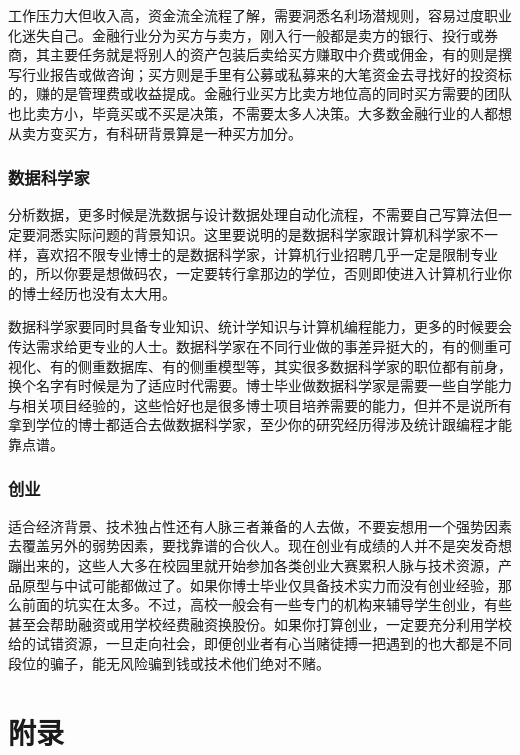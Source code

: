 \documentclass[]{tufte-book}
\begin{document}
工作压力大但收入高，资金流全流程了解，需要洞悉名利场潜规则，容易过度职业化迷失自己。金融行业分为买方与卖方，刚入行一般都是卖方的银行、投行或券商，其主要任务就是将别人的资产包装后卖给买方赚取中介费或佣金，有的则是撰写行业报告或做咨询；买方则是手里有公募或私募来的大笔资金去寻找好的投资标的，赚的是管理费或收益提成。金融行业买方比卖方地位高的同时买方需要的团队也比卖方小，毕竟买或不买是决策，不需要太多人决策。大多数金融行业的人都想从卖方变买方，有科研背景算是一种买方加分。

\hypertarget{ux6570ux636eux79d1ux5b66ux5bb6}{%
\subsection{数据科学家}\label{ux6570ux636eux79d1ux5b66ux5bb6}}

分析数据，更多时候是洗数据与设计数据处理自动化流程，不需要自己写算法但一定要洞悉实际问题的背景知识。这里要说明的是数据科学家跟计算机科学家不一样，喜欢招不限专业博士的是数据科学家，计算机行业招聘几乎一定是限制专业的，所以你要是想做码农，一定要转行拿那边的学位，否则即使进入计算机行业你的博士经历也没有太大用。

数据科学家要同时具备专业知识、统计学知识与计算机编程能力，更多的时候要会传达需求给更专业的人士。数据科学家在不同行业做的事差异挺大的，有的侧重可视化、有的侧重数据库、有的侧重模型等，其实很多数据科学家的职位都有前身，换个名字有时候是为了适应时代需要。博士毕业做数据科学家是需要一些自学能力与相关项目经验的，这些恰好也是很多博士项目培养需要的能力，但并不是说所有拿到学位的博士都适合去做数据科学家，至少你的研究经历得涉及统计跟编程才能靠点谱。

\hypertarget{ux521bux4e1a}{%
\subsection{创业}\label{ux521bux4e1a}}

适合经济背景、技术独占性还有人脉三者兼备的人去做，不要妄想用一个强势因素去覆盖另外的弱势因素，要找靠谱的合伙人。现在创业有成绩的人并不是突发奇想蹦出来的，这些人大多在校园里就开始参加各类创业大赛累积人脉与技术资源，产品原型与中试可能都做过了。如果你博士毕业仅具备技术实力而没有创业经验，那么前面的坑实在太多。不过，高校一般会有一些专门的机构来辅导学生创业，有些甚至会帮助融资或用学校经费融资换股份。如果你打算创业，一定要充分利用学校给的试错资源，一旦走向社会，即便创业者有心当赌徒搏一把遇到的也大都是不同段位的骗子，能无风险骗到钱或技术他们绝对不赌。

\hypertarget{appendix}{%
\chapter*{附录}\label{appendix}}
\end{document}
